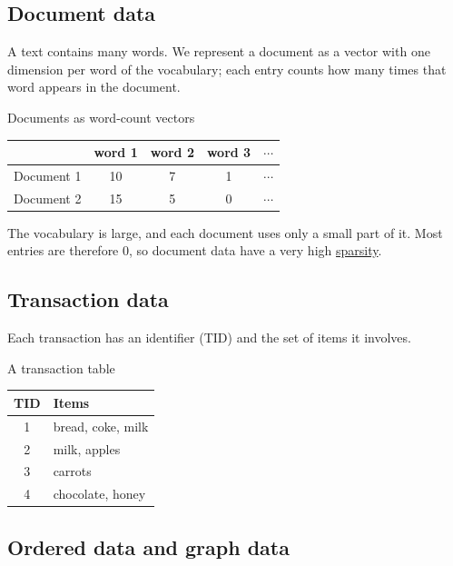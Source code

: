 \documentclass[a4paper,12pt,oneside]{report}
\begin{document}
\subsection{Document data}

A text contains many words. We represent a document as a vector with
one dimension per word of the vocabulary; each entry counts how many
times that word appears in the document.

\begin{framedexample}{Documents as word-count vectors}
\label{ex:document-vectors}
\begin{center}
\begin{tabular}{lcccc}
  \toprule
  & word 1 & word 2 & word 3 & $\cdots$\\
  \midrule
  Document 1 & 10 & 7 & 1 & $\cdots$\\
  Document 2 & 15 & 5 & 0 & $\cdots$\\
  \bottomrule
\end{tabular}
\end{center}
The vocabulary is large, and each document uses only a small part of
it. Most entries are therefore $0$, so document data have a very high
\hyperref[def:sparsity]{sparsity}.
\end{framedexample}

\subsection{Transaction data}

Each transaction has an identifier (TID) and the set of items it
involves.

\begin{framedexample}{A transaction table}\label{ex:transactions}
\begin{center}
\begin{tabular}{cl}
  \toprule
  TID & Items\\
  \midrule
  1 & bread, coke, milk\\
  2 & milk, apples\\
  3 & carrots\\
  4 & chocolate, honey\\
  \bottomrule
\end{tabular}
\end{center}
\end{framedexample}

\subsection{Ordered data and graph data}
\end{document}
